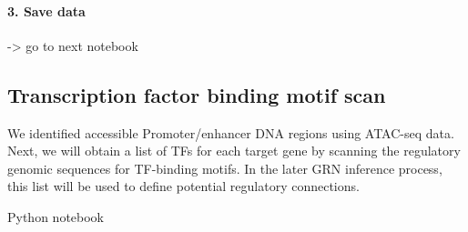 \documentclass[letterpaper,10pt,english]{sphinxmanual}
\begin{document}
\paragraph{3. Save data}
\label{\detokenize{notebooks/01_ATAC-seq_data_processing/option2_Bulk_ATAC-seq_data/01_preprocess_Bulk_ATAC_seq_peak_data:3.-Save-data}}
{
\begin{sphinxVerbatim}[commandchars=\\\{\}]
\llap{\color{nbsphinxin}[10]:\,\hspace{\fboxrule}\hspace{\fboxsep}}
\end{sphinxVerbatim}
}

-\textgreater{} go to next notebook


\subsection{Transcription factor binding motif scan}
\label{\detokenize{tutorials/motifscan:transcription-factor-binding-motif-scan}}\label{\detokenize{tutorials/motifscan:motifscan}}\label{\detokenize{tutorials/motifscan::doc}}
We identified accessible Promoter/enhancer DNA regions using ATAC-seq data.
Next, we will obtain a list of TFs for each target gene by scanning the regulatory genomic sequences for TF-binding motifs.
In the later GRN inference process, this list will be used to define potential regulatory connections.

Python notebook
\end{document}

